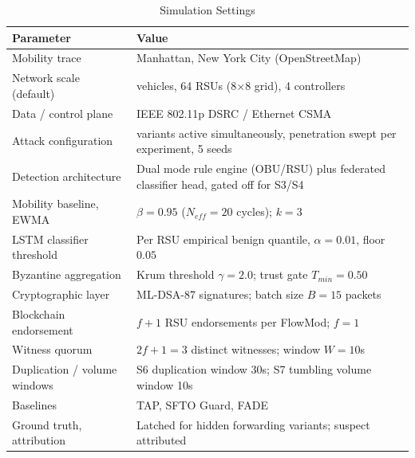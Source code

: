 \documentclass[lettersize,journal]{IEEEtran}
\theoremstyle{plain}
\theoremstyle{remark}
\begin{document}
	\begin{table}[!t]
		\centering
		\caption{Simulation Settings}
		\label{tab:sim_settings}
		\renewcommand{\arraystretch}{1.2}
		\footnotesize
		\begin{tabular}{|>{\raggedright\arraybackslash}p{3.2cm}|>{\raggedright\arraybackslash}p{4.6cm}|}
			\hline
			\textbf{Parameter} & \textbf{Value} \\
			\hline
			Mobility trace & Manhattan, New York City (OpenStreetMap) \\
			\hline
			Network scale (default) & 200 vehicles, 64 RSUs (8$\times$8 grid), 4 controllers \\
			\hline
			Data / control plane & IEEE 802.11p DSRC / Ethernet CSMA \\
			\hline
			Attack configuration & 8 variants active simultaneously, penetration swept per experiment, 5 seeds \\
			\hline
			Detection architecture & Dual mode rule engine (OBU/RSU) plus federated classifier head, gated off for S3/S4 \\
			\hline
			Mobility baseline, EWMA & $\beta = 0.95$ ($N_{eff}{=}20$ cycles); $k = 3$ \\
			\hline
			LSTM classifier threshold & Per RSU empirical benign quantile, $\alpha = 0.01$, floor $0.05$ \\
			\hline
			Byzantine aggregation & Krum threshold $\gamma = 2.0$; trust gate $T_{min} = 0.50$ \\
			\hline
			Cryptographic layer & ML-DSA-87 signatures; batch size $B = 15$ packets \\
			\hline
			Blockchain endorsement & $f{+}1$ RSU endorsements per FlowMod; $f = 1$ \\
			\hline
			Witness quorum & $2f{+}1{=}3$ distinct witnesses; window $W{=}10$s \\
			\hline
			Duplication / volume windows & S6 duplication window 30s; S7 tumbling volume window 10s \\
			\hline
			Baselines & TAP, SFTO Guard, FADE \\
			\hline
			Ground truth, attribution & Latched for hidden forwarding variants; suspect attributed \\
			\hline
		\end{tabular}
	\end{table}
	
\end{document}
